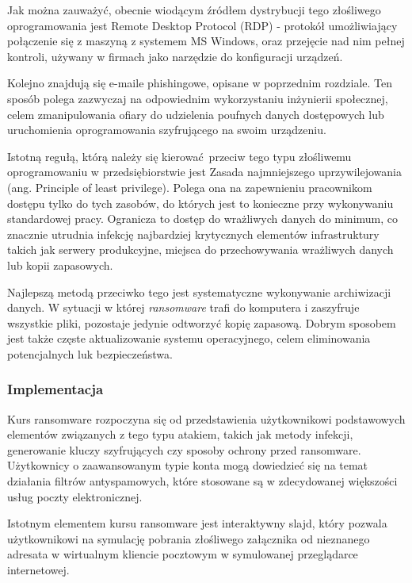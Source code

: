 \documentclass[12pt,twoside]{article}
\begin{document}
Jak można zauważyć, obecnie wiodącym źródłem dystrybucji tego złośliwego oprogramowania jest Remote Desktop Protocol (RDP) \cite{RDP} - protokół umożliwiający połączenie się z maszyną z systemem MS Windows, oraz przejęcie nad nim pełnej kontroli, używany w firmach jako narzędzie do konfiguracji urządzeń. 

Kolejno znajdują się e-maile phishingowe, opisane w poprzednim rozdziale. Ten sposób polega zazwyczaj na odpowiednim wykorzystaniu inżynierii społecznej, celem zmanipulowania ofiary do udzielenia poufnych danych dostępowych lub uruchomienia oprogramowania szyfrującego na swoim urządzeniu.  

Istotną regułą, którą należy się kierować przeciw tego typu złośliwemu oprogramowaniu w przedsiębiorstwie jest Zasada najmniejszego uprzywilejowania (ang. Principle of least privilege). Polega ona na zapewnieniu pracownikom dostępu tylko do tych zasobów, do których jest to konieczne przy wykonywaniu standardowej pracy. Ogranicza to dostęp do wrażliwych danych do minimum, co znacznie utrudnia infekcję najbardziej krytycznych elementów infrastruktury takich jak serwery produkcyjne, miejsca do przechowywania wrażliwych danych lub kopii zapasowych. 

Najlepszą metodą przeciwko tego  jest systematyczne wykonywanie archiwizacji danych. W sytuacji w której \emph{ransomware} trafi do komputera i zaszyfruje wszystkie pliki, pozostaje jedynie odtworzyć kopię zapasową. Dobrym sposobem jest także częste aktualizowanie systemu operacyjnego, celem eliminowania potencjalnych luk bezpieczeństwa.

\subsubsection{Implementacja}

Kurs ransomware rozpoczyna się od przedstawienia użytkownikowi podstawowych elementów związanych z tego typu atakiem, takich jak metody infekcji, generowanie kluczy szyfrujących czy sposoby ochrony przed ransomware. Użytkownicy o zaawansowanym typie konta mogą dowiedzieć się na temat działania filtrów antyspamowych, które stosowane są w zdecydowanej większości usług poczty elektronicznej.

Istotnym elementem kursu ransomware jest interaktywny slajd, który pozwala użytkownikowi na symulację pobrania złośliwego załącznika od nieznanego adresata w wirtualnym kliencie pocztowym w symulowanej przeglądarce internetowej. 
\end{document}
